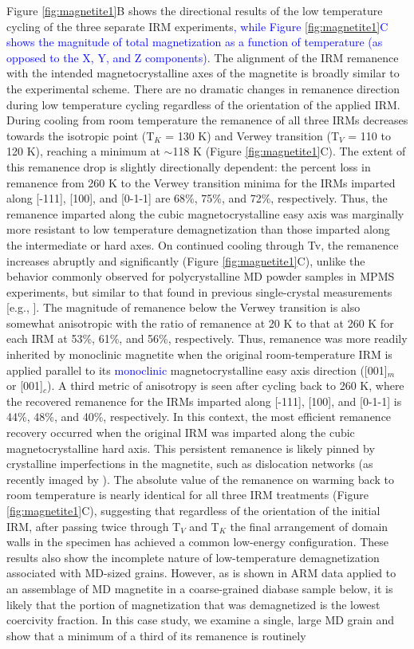 \documentclass[draft,gc]{AGUTeX}
\begin{document}
\begin{article}
Figure \ref{fig:magnetite1}B shows the directional results of the low temperature cycling of the three separate IRM experiments\textcolor{blue}{, while Figure  \ref{fig:magnetite1}C shows the magnitude of total magnetization as a function of temperature (as opposed to the X, Y, and Z components)}. The alignment of the IRM remanence with the intended magnetocrystalline axes of the magnetite is broadly similar to the experimental scheme. There are no dramatic changes in remanence direction during low temperature cycling regardless of the orientation of the applied IRM. During cooling from room temperature the remanence of all three IRMs decreases towards the isotropic point (T$_{K}$ = 130 K) and Verwey transition (T$_{V}$ = 110 to 120 K), reaching a minimum at $\sim$118 K (Figure \ref{fig:magnetite1}C). The extent of this remanence drop is slightly directionally dependent: the percent loss in remanence from 260 K to the Verwey transition minima for the IRMs imparted along [-111], [100], and [0-1-1] are 68\%, 75\%, and 72\%, respectively. Thus, the remanence imparted along the cubic magnetocrystalline easy axis was marginally more resistant to low temperature demagnetization than those imparted along the intermediate or hard axes. On continued cooling through Tv, the remanence increases abruptly and significantly (Figure \ref{fig:magnetite1}C), unlike the behavior commonly observed for polycrystalline MD powder samples in MPMS experiments, but similar to that found in previous single-crystal measurements [e.g., \cite{Ozdemir1999a, Smirnov2011a}]. The magnitude of remanence below the Verwey transition is also somewhat anisotropic with the ratio of remanence at 20 K to that at 260 K for each IRM at 53\%, 61\%, and 56\%, respectively. Thus, remanence was more readily inherited by monoclinic magnetite when the original room-temperature IRM is applied parallel to its \textcolor{blue}{monoclinic} magnetocrystalline easy axis direction ([001]$_{m}$ or [001]$_{c}$). A third metric of anisotropy is seen after cycling back to 260 K, where the recovered remanence for the IRMs imparted along [-111], [100], and [0-1-1] is 44\%, 48\%, and 40\%, respectively. In this context, the most efficient remanence recovery occurred when the original IRM was imparted along the cubic magnetocrystalline hard axis. This persistent remanence is likely pinned by crystalline imperfections in the magnetite, such as dislocation networks (as recently imaged by \cite{Lindquist2014a}). The absolute value of the remanence on warming back to room temperature is nearly identical for all three IRM treatments (Figure \ref{fig:magnetite1}C), suggesting that regardless of the orientation of the initial IRM, after passing twice through T$_{V}$ and T$_{K}$ the final arrangement of domain walls in the specimen has achieved a common low-energy configuration. These results also show the incomplete nature of low-temperature demagnetization associated with MD-sized grains. However, as is shown in ARM data applied to an assemblage of MD magnetite in a coarse-grained diabase sample below, it is likely that the portion of magnetization that was demagnetized is the lowest coercivity fraction. In this case study, we examine a single, large MD grain and show that a minimum of a third of its remanence is routinely 
\end{article}
\end{document}
